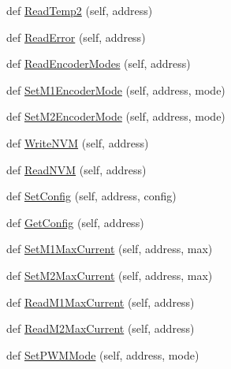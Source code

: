 \begin{DoxyCompactItemize}
\item 
def \mbox{\hyperlink{classtoxic__hardware_1_1roboclaw__3_1_1Roboclaw_af77edd445ded527a2b618fe9378caea5}{Read\+Temp2}} (self, address)
\item 
def \mbox{\hyperlink{classtoxic__hardware_1_1roboclaw__3_1_1Roboclaw_acc2231b738fad390bcfd430add32435a}{Read\+Error}} (self, address)
\item 
def \mbox{\hyperlink{classtoxic__hardware_1_1roboclaw__3_1_1Roboclaw_a09e645ade7c39bf20c26b40b220c6076}{Read\+Encoder\+Modes}} (self, address)
\item 
def \mbox{\hyperlink{classtoxic__hardware_1_1roboclaw__3_1_1Roboclaw_a5730ead83a1a548202c4a8b036eb998d}{Set\+M1\+Encoder\+Mode}} (self, address, mode)
\item 
def \mbox{\hyperlink{classtoxic__hardware_1_1roboclaw__3_1_1Roboclaw_ad1f7e57fd7f9850785d6409501ccdd10}{Set\+M2\+Encoder\+Mode}} (self, address, mode)
\item 
def \mbox{\hyperlink{classtoxic__hardware_1_1roboclaw__3_1_1Roboclaw_a64cdc36cd76da7bf618caa9289f8f6a0}{Write\+N\+VM}} (self, address)
\item 
def \mbox{\hyperlink{classtoxic__hardware_1_1roboclaw__3_1_1Roboclaw_aef169dbf1d75179644ccbcac477bd764}{Read\+N\+VM}} (self, address)
\item 
def \mbox{\hyperlink{classtoxic__hardware_1_1roboclaw__3_1_1Roboclaw_ac40b29aa97e536fecfb6ef38db3c4105}{Set\+Config}} (self, address, config)
\item 
def \mbox{\hyperlink{classtoxic__hardware_1_1roboclaw__3_1_1Roboclaw_a3c8c1a712ae9ad645ea78ceb1ff5eb1e}{Get\+Config}} (self, address)
\item 
def \mbox{\hyperlink{classtoxic__hardware_1_1roboclaw__3_1_1Roboclaw_a3573d1ecc437b240ec464369e5b0fc5d}{Set\+M1\+Max\+Current}} (self, address, max)
\item 
def \mbox{\hyperlink{classtoxic__hardware_1_1roboclaw__3_1_1Roboclaw_a04b33d51c8c047765a89e5b4f39a5718}{Set\+M2\+Max\+Current}} (self, address, max)
\item 
def \mbox{\hyperlink{classtoxic__hardware_1_1roboclaw__3_1_1Roboclaw_ab3c998c03f0356059004d5d386dce074}{Read\+M1\+Max\+Current}} (self, address)
\item 
def \mbox{\hyperlink{classtoxic__hardware_1_1roboclaw__3_1_1Roboclaw_a46a0528d6f092608c9c613b9253d2fda}{Read\+M2\+Max\+Current}} (self, address)
\item 
def \mbox{\hyperlink{classtoxic__hardware_1_1roboclaw__3_1_1Roboclaw_a98fd64ce1c25ea837a7c589469810d39}{Set\+P\+W\+M\+Mode}} (self, address, mode)

\end{DoxyCompactItemize}
